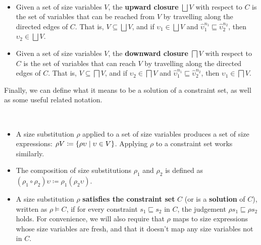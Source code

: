 \begin{definition}~\\[-4ex]
\begin{itemize}
  \item Given a set of size variables $V$, the \textbf{upward closure} $\bigsqcup V$ with respect to $C$ is the set of variables that can be reached from $V$ by travelling along the directed edges of $C$.
  That is, $V \subseteq \bigsqcup V$, and if $\upsilon_1 \in \bigsqcup V$ and $\hat{\upsilon}_1^{n_1} \sqsubseteq \hat{\upsilon}_2^{n_2}$, then $\upsilon_2 \in \bigsqcup V$.
  \item Given a set of size variables $V$, the \textbf{downward closure} $\bigsqcap V$ with respect to $C$ is the set of variables that can reach $V$ by travelling along the directed edges of $C$.
  That is, $V \subseteq \bigsqcap V$, and if $\upsilon_2 \in \bigsqcap V$ and $\hat{\upsilon}_1^{n_1} \sqsubseteq \hat{\upsilon}_2^{n_2}$, then $\upsilon_1 \in \bigsqcap V$.
\end{itemize}
\end{definition}

Finally, we can define what it means to be a solution of a constraint set,
as well as some useful related notation.

\begin{definition}~\\[-4ex]
\begin{itemize}
  \item A size substitution $\rho$ applied to a set of size variables produces a set of size expressions:
  $\rho V \coloneqq \{\rho \upsilon \mid \upsilon \in V\}$.
  Applying $\rho$ to a constraint set works similarly.

  \item The composition of size substitutions $\rho_1$ and $\rho_2$ is defined as \mbox{$(\rho_1 \circ \rho_2) \upsilon \coloneqq \rho_1(\rho_2 \upsilon)$}.

  \item A size substitution $\rho$ \textbf{satisfies the constraint set} $C$ (or is a \textbf{solution} of $C$), written as $\rho \vDash C$, if for every constraint $s_1 \sqsubseteq s_2$ in $C$, the judgement $\rho s_1 \sqsubseteq \rho s_2$ holds.
  For convenience, we will also require that $\rho$ maps to size expressions whose size variables are fresh,
  and that it doesn't map any size variables not in $C$.
\end{itemize}
\end{definition}

